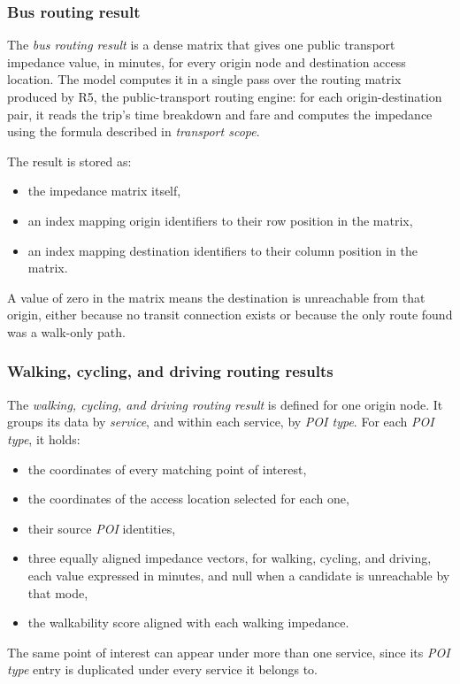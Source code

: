 \documentclass{article}
\begin{document}
\subsubsection*{Bus routing result}
    The \emph{bus routing result} is a dense matrix that gives one public
    transport impedance value, in minutes, for every origin node and
    destination access location. The model computes it in a single pass over
    the routing matrix produced by R5, the public-transport routing engine:
    for each origin-destination pair, it reads the trip's time breakdown and
    fare and computes the impedance using the formula described in \emph{transport
    scope}.

    The result is stored as:
    \begin{itemize}
        \item the impedance matrix itself,
        \item an index mapping origin identifiers to their row position in
        the matrix,
        \item an index mapping destination identifiers to their column
        position in the matrix.
    \end{itemize}
    A value of zero in the matrix means the destination is unreachable from
    that origin, either because no transit connection exists or because the
    only route found was a walk-only path.

\subsubsection*{Walking, cycling, and driving routing results}
    The \emph{walking, cycling, and driving routing result} is defined for one
    origin node. It groups its data by \emph{service}, and within each
    service, by \emph{POI type}. For each \emph{POI type}, it holds:
    \begin{itemize}
        \item the coordinates of every matching point of interest,
        \item the coordinates of the access location selected for each one,
        \item their source \emph{POI} identities,
        \item three equally aligned impedance vectors, for walking, cycling,
        and driving, each value expressed in minutes, and null when a
        candidate is unreachable by that mode,
        \item the walkability score aligned with each walking impedance.
    \end{itemize}
    The same point of interest can appear under more than one service, since
    its \emph{POI type} entry is duplicated under every service it belongs
    to.
\end{document}
